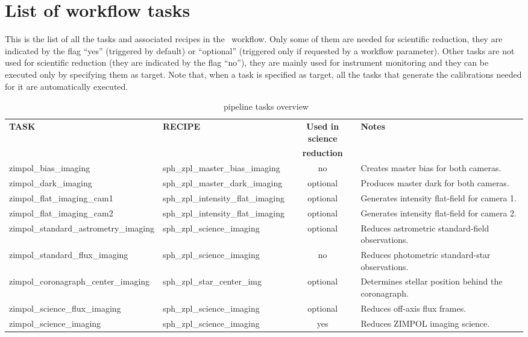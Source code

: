 \section{List of workflow tasks}

This is the list of all the tasks and associated recipes in the \instname\ workflow.
Only some of them are needed for scientific reduction, they are indicated by the flag ``yes'' (triggered by default) or ``optional'' (triggered only if requested
by a workflow parameter). Other tasks are not used for scientific reduction (they are indicated by the flag ``no''), they are mainly used
for instrument monitoring and they can be executed only by specifying them as target. Note that, when a task is specified as target, all the
tasks that generate the calibrations needed for it are automatically executed.

\begin{table}[htbp]
\centering
\scriptsize
\begin{tabular}{|l|l|c|p{7cm}|}
\hline
\textbf{TASK} & \textbf{RECIPE} & \textbf{Used in science} & \textbf{Notes} \\
              &                 & \textbf{reduction} &                \\
\hline 
zimpol\_bias\_imaging & sph\_zpl\_master\_bias\_imaging & no &
Creates master bias for both cameras. \\
zimpol\_dark\_imaging & sph\_zpl\_master\_dark\_imaging & optional &
Produces master dark for both cameras. \\
zimpol\_flat\_imaging\_cam1 & sph\_zpl\_intensity\_flat\_imaging & optional &
Generates intensity flat-field for camera 1. \\
zimpol\_flat\_imaging\_cam2 & sph\_zpl\_intensity\_flat\_imaging & optional &
Generates intensity flat-field for camera 2. \\
zimpol\_standard\_astrometry\_imaging & sph\_zpl\_science\_imaging & optional &
Reduces astrometric standard-field observations. \\
zimpol\_standard\_flux\_imaging & sph\_zpl\_science\_imaging & no &
Reduces photometric standard-star observations. \\
zimpol\_coronagraph\_center\_imaging & sph\_zpl\_star\_center\_img & optional &
Determines stellar position behind the coronagraph. \\
zimpol\_science\_flux\_imaging & sph\_zpl\_science\_imaging & optional &
Reduces off-axis flux frames. \\
zimpol\_science\_imaging & sph\_zpl\_science\_imaging & yes &
Reduces ZIMPOL imaging science. \\
\hline
\end{tabular}
\caption{\instname\ pipeline tasks overview}
\end{table}
